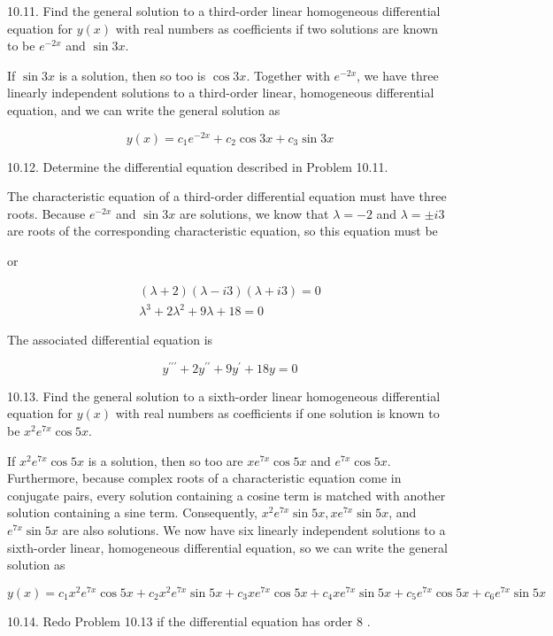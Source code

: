 \documentclass[10pt]{article}
\begin{document}
10.11. Find the general solution to a third-order linear homogeneous differential equation for $y(x)$ with real numbers as coefficients if two solutions are known to be $e^{-2 x}$ and $\sin 3 x$.

If $\sin 3 x$ is a solution, then so too is $\cos 3 x$. Together with $e^{-2 x}$, we have three linearly independent solutions to a third-order linear, homogeneous differential equation, and we can write the general solution as

$$
y(x)=c_{1} e^{-2 x}+c_{2} \cos 3 x+c_{3} \sin 3 x
$$

10.12. Determine the differential equation described in Problem 10.11.

The characteristic equation of a third-order differential equation must have three roots. Because $e^{-2 x}$ and $\sin 3 x$ are solutions, we know that $\lambda=-2$ and $\lambda= \pm i 3$ are roots of the corresponding characteristic equation, so this equation must be

or

$$
\begin{gathered}
(\lambda+2)(\lambda-i 3)(\lambda+i 3)=0 \\
\lambda^{3}+2 \lambda^{2}+9 \lambda+18=0
\end{gathered}
$$

The associated differential equation is

$$
y^{\prime \prime \prime}+2 y^{\prime \prime}+9 y^{\prime}+18 y=0
$$

10.13. Find the general solution to a sixth-order linear homogeneous differential equation for $y(x)$ with real numbers as coefficients if one solution is known to be $x^{2} e^{7 x} \cos 5 x$.

If $x^{2} e^{7 x} \cos 5 x$ is a solution, then so too are $x e^{7 x} \cos 5 x$ and $e^{7 x} \cos 5 x$. Furthermore, because complex roots of a characteristic equation come in conjugate pairs, every solution containing a cosine term is matched with another solution containing a sine term. Consequently, $x^{2} e^{7 x} \sin 5 x, x e^{7 x} \sin 5 x$, and $e^{7 x} \sin 5 x$ are also solutions. We now have six linearly independent solutions to a sixth-order linear, homogeneous differential equation, so we can write the general solution as

$$
y(x)=c_{1} x^{2} e^{7 x} \cos 5 x+c_{2} x^{2} e^{7 x} \sin 5 x+c_{3} x e^{7 x} \cos 5 x+c_{4} x e^{7 x} \sin 5 x+c_{5} e^{7 x} \cos 5 x+c_{6} e^{7 x} \sin 5 x
$$

10.14. Redo Problem 10.13 if the differential equation has order 8 .
\end{document}
